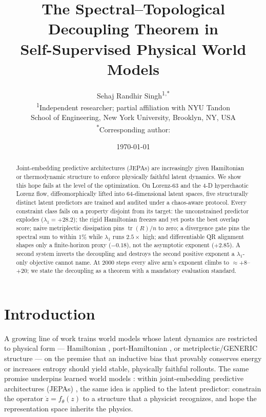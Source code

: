 \documentclass[11pt]{article}
\title{\bf The Spectral--Topological Decoupling Theorem in\\
Self-Supervised Physical World Models}
\author{Sehaj Randhir Singh\textsuperscript{1,*}\\[2pt]
\small \textsuperscript{1}Independent researcher; partial affiliation with
NYU Tandon\\ School of Engineering, New York University, Brooklyn, NY, USA\\
\textsuperscript{*}Corresponding author: \FILL{email}}
\date{\today}
\newcommand{\tr}{\operatorname{tr}}
\begin{document}
\maketitle

\begin{abstract}
Joint-embedding predictive architectures (JEPAs) are increasingly given
Hamiltonian or thermodynamic structure to enforce physically faithful
latent dynamics. We show this hope fails at the level of the
optimization. On Lorenz-63 and the 4-D hyperchaotic Lorenz flow,
diffeomorphically lifted into 64-dimensional latent spaces, five
structurally distinct latent predictors are trained and audited under a
chaos-aware protocol. Every constraint class fails on a property disjoint from its target: the
unconstrained predictor explodes ($\lambda_1=+28.2$); the rigid
Hamiltonian freezes and yet posts the best overlap score; naive
metriplectic dissipation pins $\tr(R)/n$ to zero; a divergence gate pins
the spectral sum to within $1\%$ while $\lambda_1$ runs $2.5\times$ high;
and differentiable QR alignment shapes only a finite-horizon proxy
($-0.18$), not the asymptotic exponent ($+2.85$). A second system
inverts the decoupling and destroys the second positive exponent a
$\lambda_1$-only objective cannot name. At 2000 steps every alive arm's
exponent climbs to $\approx{+}8$--$+20$; we state the decoupling as a
theorem with a mandatory evaluation standard.
\end{abstract}

\section{Introduction}
\label{sec:intro}

A growing line of work trains world models whose latent dynamics are
restricted to physical form --- Hamiltonian \cite{greydanus2019hamiltonian,
cranmer2020lagrangian}, port-Hamiltonian \cite{van2020port}, or
metriplectic/GENERIC \cite{morrison1986metriplectic,grmela1997dynamics,
ottinger1997dynamics} structure --- on the premise that an inductive bias
that provably conserves energy or increases entropy should yield stable,
physically faithful rollouts. The same promise underpins learned world
models \cite{ha2018world,hafner2020mastering,bruce2024genie}: within
joint-embedding predictive architectures (JEPAs)
\cite{lecun2022pathway,assran2023self,bardes2024revisiting,garrido2024learning},
the same idea is applied to the latent predictor: constrain the operator
$\dot z = f_\theta(z)$ to a structure that a physicist recognizes, and
hope the representation space inherits the physics.
\end{document}
